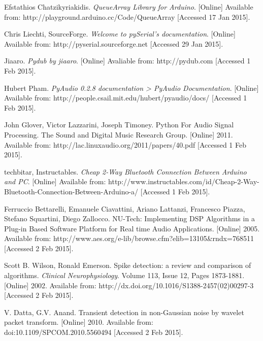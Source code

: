 \begin{thebibliography}{99}

    Efstathios Chatzikyriakidis. \emph{QueueArray Library for Arduino}. [Online] Available from: http://playground.arduino.cc/Code/QueueArray [Accessed 17 Jan 2015].

    Chris Liechti, SourceForge. \emph{Welcome to pySerial's documentation}. [Online] Available from: http://pyserial.sourceforge.net [Accessed 29 Jan 2015].

    Jiaaro. \emph{Pydub by jiaaro}. [Online] Avaliable from: http://pydub.com [Accessed 1 Feb 2015].

    Hubert Pham. \emph{PyAudio 0.2.8 documentation > PyAudio Documentation}. [Online] Available from: http://people.csail.mit.edu/hubert/pyaudio/docs/ [Accessed 1 Feb 2015].
    
    
    John Glover, Victor Lazzarini, Joseph Timoney. Python For Audio Signal Processing. The Sound and Digital Music Research Group. [Online] 2011. Available from: http://lac.linuxaudio.org/2011/papers/40.pdf [Accessed 1 Feb 2015].

    techbitar, Instructables. \emph{Cheap 2-Way Bluetooth Connection Between Arduino and PC}. [Online] Available from: http://www.instructables.com/id/Cheap-2-Way-Bluetooth-Connection-Between-Arduino-a/ [Accessed 1 Feb 2015].

    Ferruccio Bettarelli, Emanuele Ciavattini, Ariano Lattanzi, Francesco Piazza, Stefano Squartini, Diego Zallocco. NU-Tech: Implementing DSP Algorithms in a Plug-in Based Software Platform for Real time Audio Applications. [Online] 2005. Available from: http://www.aes.org/e-lib/browse.cfm?elib=13105\&rndx=768511 [Accessed 2 Feb 2015].

    Scott B. Wilson, Ronald Emerson. Spike detection: a review and comparison of algorithms. \emph{Clinical Neurophysiology}. Volume 113, Issue 12, Pages 1873-1881. [Online] 2002. Available from: http://dx.doi.org/10.1016/S1388-2457(02)00297-3 [Accessed 2 Feb 2015].
    
    V. Datta, G.V. Anand. Transient detection in non-Gaussian noise by wavelet packet transform. [Online] 2010. Available from: doi:10.1109/SPCOM.2010.5560494 [Accessed 2 Feb 2015].





\end{thebibliography}
